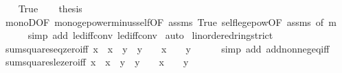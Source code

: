 \begin{isabellebody}
\ \ \isamarkupfalse%
\ True\isanewline
\ \ \isamarkupfalse%
\ {\isacharquery}{\kern0pt}thesis\isanewline
\ \ \ \ \isamarkupfalse%
\ monoD{\isacharbrackleft}{\kern0pt}OF\ mono{\isacharunderscore}{\kern0pt}ge{}{\isacharunderscore}{\kern0pt}power{\isacharunderscore}{\kern0pt}minus{\isacharunderscore}{\kern0pt}self{\isacharbrackleft}{\kern0pt}OF\ assms{\isacharbrackright}{\kern0pt}\ True{\isacharbrackright}{\kern0pt}\ self{\isacharunderscore}{\kern0pt}le{\isacharunderscore}{\kern0pt}ge{}{\isacharunderscore}{\kern0pt}pow{\isacharbrackleft}{\kern0pt}OF\ assms{\isacharcomma}{\kern0pt}\ of\ m{\isacharbrackright}{\kern0pt}\isanewline
\ \ \ \ \isamarkupfalse%
\ {\isacharparenleft}{\kern0pt}simp\ add{\isacharcolon}{\kern0pt}\ le{\isacharunderscore}{\kern0pt}diff{\isacharunderscore}{\kern0pt}conv\ le{\isacharunderscore}{\kern0pt}diff{\isacharunderscore}{\kern0pt}conv{}{\isacharparenright}{\kern0pt}\isanewline
{}\isamarkupfalse%
\ auto%
\endisatagproof
{\isafoldproof}%
%
\isadelimproof
\isanewline
%
\endisadelimproof
\isanewline
\isanewline
{}\isamarkupfalse%
\ linordered{\isacharunderscore}{\kern0pt}ring{\isacharunderscore}{\kern0pt}strict\isanewline
{}\isanewline
\isanewline
{}\isamarkupfalse%
\ sum{\isacharunderscore}{\kern0pt}squares{\isacharunderscore}{\kern0pt}eq{\isacharunderscore}{\kern0pt}zero{\isacharunderscore}{\kern0pt}iff{\isacharcolon}{\kern0pt}\ {\isachardoublequoteopen}x\ {\isacharasterisk}{\kern0pt}\ x\ {\isacharplus}{\kern0pt}\ y\ {\isacharasterisk}{\kern0pt}\ y\ {\isacharequal}{\kern0pt}\ {}\ {\isasymlongleftrightarrow}\ x\ {\isacharequal}{\kern0pt}\ {}\ {\isasymand}\ y\ {\isacharequal}{\kern0pt}\ {}{\isachardoublequoteclose}\isanewline
%
\isadelimproof
\ \ %
\endisadelimproof
%
\isatagproof
{}\isamarkupfalse%
\ {\isacharparenleft}{\kern0pt}simp\ add{\isacharcolon}{\kern0pt}\ add{\isacharunderscore}{\kern0pt}nonneg{\isacharunderscore}{\kern0pt}eq{\isacharunderscore}{\kern0pt}{}{\isacharunderscore}{\kern0pt}iff{\isacharparenright}{\kern0pt}%
\endisatagproof
{\isafoldproof}%
%
\isadelimproof
\isanewline
%
\endisadelimproof
\isanewline
{}\isamarkupfalse%
\ sum{\isacharunderscore}{\kern0pt}squares{\isacharunderscore}{\kern0pt}le{\isacharunderscore}{\kern0pt}zero{\isacharunderscore}{\kern0pt}iff{\isacharcolon}{\kern0pt}\ {\isachardoublequoteopen}x\ {\isacharasterisk}{\kern0pt}\ x\ {\isacharplus}{\kern0pt}\ y\ {\isacharasterisk}{\kern0pt}\ y\ {\isasymle}\ {}\ {\isasymlongleftrightarrow}\ x\ {\isacharequal}{\kern0pt}\ {}\ {\isasymand}\ y\ {\isacharequal}{\kern0pt}\ {}{\isachardoublequoteclose}\isanewline

\end{isabellebody}

